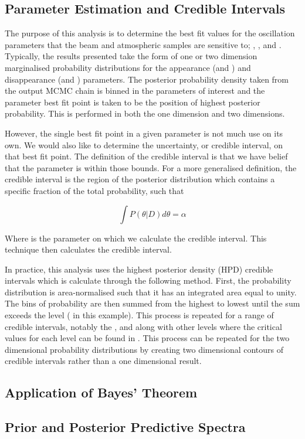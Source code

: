 \subsection{Parameter Estimation and Credible Intervals}
\label{sec:MarkovChainMonteCarlo_ParameterEstimation}

The purpose of this analysis is to determine the best fit values for the oscillation parameters that the beam and atmospheric samples are sensitive to; \sinsqatm, \sinsqreac, \delmsqatm and \dcp. Typically, the results presented take the form of one or two dimension marginalised probability distributions for the appearance (\sinsqreac and \dcp) and disappearance (\sinsqatm and \delmsqatm) parameters. The posterior probability density taken from the output MCMC chain is binned in the parameters of interest and the parameter best fit point is taken to be the position of highest posterior probability. This is performed in both the one dimension and two dimensions.

However, the single best fit point in a given parameter is not much use on its own. We would also like to determine the uncertainty, or credible interval, on that best fit point. The definition of the \quickmath{1\sigma} credible interval is that we have  belief that the parameter is within those bounds. For a more generalised definition, the credible interval is the region of the posterior distribution which contains a specific fraction of the total probability, such that

\begin{equation}
\int P(\theta|D)d\theta = \alpha
\end{equation}

Where \quickmath{\theta} is the parameter on which we calculate the credible interval. This technique then calculates the  credible interval.

In practice, this analysis uses the highest posterior density (HPD) credible intervals which is calculate through the following method. First, the probability distribution is area-normalised such that it has an integrated area equal to unity. The bins of probability are then summed from the highest to lowest until the sum exceeds the \quickmath{1\sigma} level ( in this example). This process is repeated for a range of credible intervals, notably the \quickmath{1\sigma}, \quickmath{2\sigma} and \quickmath{3\sigma} along with other levels where the critical values for each level can be found in . This process can be repeated for the two dimensional probability distributions by creating two dimensional contours of credible intervals rather than a one dimensional result. 

\subsection{Application of Bayes' Theorem}
\label{sec:MarkovChainMonteCarlo_BayesTheorem}

\subsection{Prior and Posterior Predictive Spectra}
\label{sec:MarkovChainMonteCarlo_Predictives}
